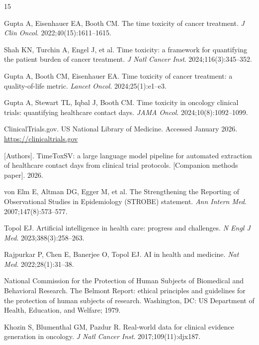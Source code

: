 \documentclass[12pt]{article}
\begin{document}
\begin{thebibliography}{15}

Gupta A, Eisenhauer EA, Booth CM.
The time toxicity of cancer treatment.
\textit{J Clin Oncol}. 2022;40(15):1611--1615.

Shah KN, Turchin A, Engel J, et al.
Time toxicity: a framework for quantifying the patient burden of cancer treatment.
\textit{J Natl Cancer Inst}. 2024;116(3):345--352.

Gupta A, Booth CM, Eisenhauer EA.
Time toxicity of cancer treatment: a quality-of-life metric.
\textit{Lancet Oncol}. 2024;25(1):e1--e3.

Gupta A, Stewart TL, Iqbal J, Booth CM.
Time toxicity in oncology clinical trials: quantifying healthcare contact days.
\textit{JAMA Oncol}. 2024;10(8):1092--1099.

ClinicalTrials.gov. US National Library of Medicine.
Accessed January 2026.
\url{https://clinicaltrials.gov}

[Authors].
TimeToxSV: a large language model pipeline for automated extraction of healthcare contact days from clinical trial protocols.
[Companion methods paper]. 2026.

von Elm E, Altman DG, Egger M, et al.
The Strengthening the Reporting of Observational Studies in Epidemiology (STROBE) statement.
\textit{Ann Intern Med}. 2007;147(8):573--577.

Topol EJ.
Artificial intelligence in health care: progress and challenges.
\textit{N Engl J Med}. 2023;388(3):258--263.

Rajpurkar P, Chen E, Banerjee O, Topol EJ.
AI in health and medicine.
\textit{Nat Med}. 2022;28(1):31--38.

National Commission for the Protection of Human Subjects of Biomedical and Behavioral Research.
The Belmont Report: ethical principles and guidelines for the protection of human subjects of research.
Washington, DC: US Department of Health, Education, and Welfare; 1979.

Khozin S, Blumenthal GM, Pazdur R.
Real-world data for clinical evidence generation in oncology.
\textit{J Natl Cancer Inst}. 2017;109(11):djx187.


\end{thebibliography}
\end{document}
